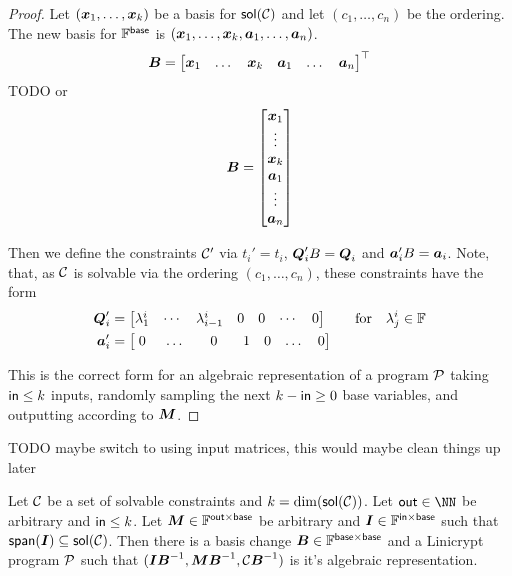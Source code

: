\begin{proof}
Let $(\vx_1, \dots, \vx_k)$ be a basis for $\sol(\C)$ and let $(c_1, \dots, c_n)$ be the ordering.
The new basis for $\Base$ is $(\vx_1, \dots, \vx_k, \va_1, \dots, \va_n)$.
\[
    \B = 
    \begin{bmatrix}
\vx_1 &
\dots &
\vx_k &
\va_1 &
\dots &
\va_n
    \end{bmatrix}^\top
\]
TODO or
\[
    \B =
    \begin{bmatrix}
\vx_1 \\
\vdots \\
\vx_k \\
\va_1 \\
\vdots \\
\va_n
    \end{bmatrix}
\]

Then we define the constraints $\C'$ via $t_i' = t_i$, $\Q_i' B = \Q_i$ and $\va_i' B = \va_i$.
Note, that, as $\C$ is solvable via the ordering $(c_1, \dots, c_n)$,
these constraints have the form
\begin{align*}
\Q_i' &= \begin{bmatrix} \lambda^i_1 & \cdots & \lambda^i_{i-1} & 0 & 0 & \cdots & 0 \end{bmatrix} \qquad \textrm{for} \quad \lambda^i_j \in \F \\
\va_i' &= \begin{bmatrix} \;0\;\, & \dots & \;\;\;0\;\;\; & 1 & 0 & \dots & 0 \end{bmatrix}
\end{align*}

This is the correct form for an algebraic representation of a program $\P$ taking $\inp \leq k$ inputs,
randomly sampling the next $k - \inp \geq 0$ base variables,
and outputting according to $\M$.
\end{proof}

TODO maybe switch to using input matrices, this would maybe clean things up later
\begin{lemma}
Let $\C$ be a set of solvable constraints and $k = \dim (\sol (\C))$.
Let $\out \in \NN$ be arbitrary and $\inp \leq k$.
Let $\M \in \F^{\out \times \base}$ be arbitrary and $\Inp \in \F^{\inp \times \base}$ such that $\spn(\Inp) \subseteq \sol(\C)$.
Then there is a basis change $\B \in \F^{\base \times \base}$ and a Linicrypt program $\P$
such that $(\Inp \B^{-1}, \M\B^{-1}, \C \B^{-1})$ is it's algebraic representation.
\end{lemma}


